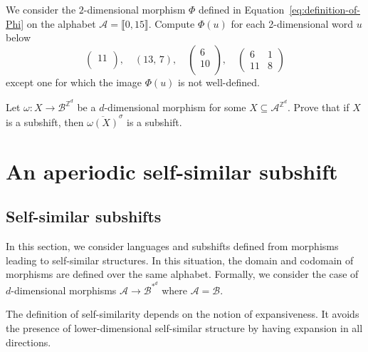 \documentclass[12pt]{amsart}
\newcommand{\Z}{\mathbb{Z}}
\newcommand{\Acal}{\mathcal{A}} %
\newcommand{\Bcal}{\mathcal{B}}
\newcommand{\shiftclosure}[1]{{\overline{#1}^{\sigma}}}
\newcommand{\Zrange}[1]{\llbracket0,#1\rrbracket}
\begin{document}
\begin{exo}[label={exo:easy-image-by-Phi}]
We consider the $2$-dimensional morphism $\Phi$ 
    defined in Equation~\eqref{eq:definition-of-Phi}
    on the alphabet $\Acal=\Zrange{15}$.
Compute $\Phi(u)$ for each 2-dimensional word $u$ below
    \[
    \left(\begin{array}{c}
    11 \\
    \end{array}\right)
    ,\quad
    \left(13, \, 7\right)
    ,\quad
    \left(\begin{array}{c}
    6 \\
    10 \\
    \end{array}\right)
    ,\quad
    \left(\begin{array}{cc}
    6 & 1 \\
    11 & 8
    \end{array}\right)
    \]
except one for which the image $\Phi(u)$ is not well-defined.
\end{exo}


\begin{exo}[label={exo:image-of-subshift-is-a-subshift}]
    Let $\omega:X\to\Bcal^{\Z^d}$ be a $d$-dimensional morphism for some 
    $X\subseteq\Acal^{\Z^d}$.
    Prove that if $X$ is a subshift, then
$\shiftclosure{\omega(X)}$ is a subshift.
\end{exo}


\section{An aperiodic self-similar subshift}\label{chap:Labbe:sec:aperiodic-self-similar-subshifts}


\subsection{Self-similar subshifts}\label{chap:Labbe:subsec:self-similar-subshifts}


In this section, we consider languages and subshifts defined from morphisms
leading to self-similar structures. 
In this situation, the domain and codomain
of morphisms are defined over the same alphabet. 
Formally, we consider the case of $d$-dimensional morphisms
$\Acal\to\Bcal^{*^d}$ where $\Acal=\Bcal$.

The definition of self-similarity depends on the notion of expansiveness.
It avoids the presence of lower-dimensional self-similar structure by having
expansion in all directions.
\end{document}

